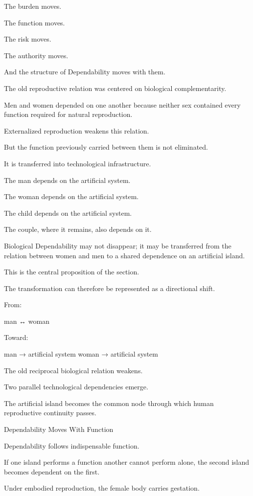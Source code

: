 The burden moves.

The function moves.

The risk moves.

The authority moves.

And the structure of Dependability moves with them.

The old reproductive relation was centered on biological complementarity.

Men and women depended on one another because neither sex contained every function required for natural reproduction.

Externalized reproduction weakens this relation.

But the function previously carried between them is not eliminated.

It is transferred into technological infrastructure.

The man depends on the artificial system.

The woman depends on the artificial system.

The child depends on the artificial system.

The couple, where it remains, also depends on it.

Biological Dependability may not disappear; it may be transferred from the relation between women and men to a shared dependence on an artificial island.

This is the central proposition of the section.

The transformation can therefore be represented as a directional shift.

From:

man ↔ woman

Toward:

man → artificial system
woman → artificial system

The old reciprocal biological relation weakens.

Two parallel technological dependencies emerge.

The artificial island becomes the common node through which human reproductive continuity passes.

Dependability Moves With Function

Dependability follows indispensable function.

If one island performs a function another cannot perform alone, the second island becomes dependent on the first.

Under embodied reproduction, the female body carries gestation.

